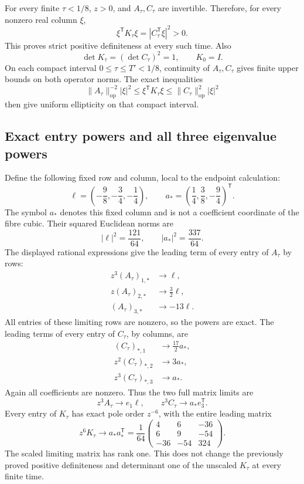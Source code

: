 For every finite \(\tau<1/8\), \(z>0\), and \(A_\tau,C_\tau\) are
invertible. Therefore, for every nonzero real column \(\xi\),
\[
\xi^{\mathsf T}K_\tau\xi=|C_\tau^{\mathsf T}\xi|^2>0.
\]
This proves strict positive definiteness at every such time. Also
\[
\det K_\tau=(\det C_\tau)^2=1,\qquad K_0=I.
\]
On each compact interval \(0\le\tau\le T'<1/8\), continuity of
\(A_\tau,C_\tau\) gives finite upper bounds on both operator norms.
The exact inequalities
\[
\|A_\tau\|_{\mathrm{op}}^{-2}|\xi|^2
\le \xi^{\mathsf T}K_\tau\xi
\le\|C_\tau\|_{\mathrm{op}}^2|\xi|^2
\]
then give uniform ellipticity on that compact interval.

\subsection{Exact entry powers and all three eigenvalue powers}

Define the following fixed row and column, local to the endpoint
calculation:
\[
\ell=\left(-\frac98,-\frac34,-\frac14\right),\qquad
a_*=\left(\frac14,\frac38,-\frac94\right)^{\mathsf T}.
\]
The symbol \(a_*\) denotes this fixed column and is not a coefficient
coordinate of the fibre cubic. Their squared Euclidean norms are
\[
|\ell|^2=\frac{121}{64},\qquad |a_*|^2=\frac{337}{64}.
\]
The displayed rational expressions give the leading term of every entry
of \(A_\tau\) by rows:
\[
\begin{aligned}
z^3(A_\tau)_{1,*}&\longrightarrow\ell,\\
z(A_\tau)_{2,*}&\longrightarrow\frac32\ell,\\
(A_\tau)_{3,*}&\longrightarrow-13\ell.
\end{aligned}
\]
All entries of these limiting rows are nonzero, so the powers are exact.
The leading terms of every entry of \(C_\tau\), by columns, are
\[
\begin{aligned}
(C_\tau)_{*,1}&\longrightarrow\frac{17}{2}a_*,\\
z^2(C_\tau)_{*,2}&\longrightarrow3a_*,\\
z^3(C_\tau)_{*,3}&\longrightarrow a_*.
\end{aligned}
\]
Again all coefficients are nonzero. Thus the two full matrix limits are
\[
z^3A_\tau\longrightarrow e_1\ell,\qquad
z^3C_\tau\longrightarrow a_*e_3^{\mathsf T}.
\]
Every entry of \(K_\tau\) has exact pole order \(z^{-6}\), with the entire
leading matrix
\[
z^6K_\tau\longrightarrow a_*a_*^{\mathsf T}
=\frac1{64}
\begin{pmatrix}
4&6&-36\\
6&9&-54\\
-36&-54&324
\end{pmatrix}.
\]
The scaled limiting matrix has rank one. This does not change the
previously proved positive definiteness and determinant one of the
unscaled \(K_\tau\) at every finite time.

